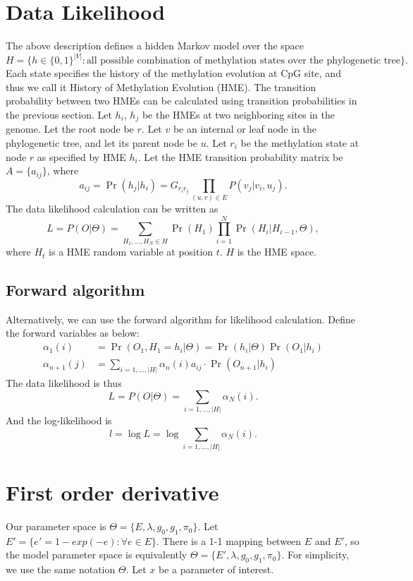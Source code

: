 \documentclass[11pt]{article}
\begin{document}
\section{Data Likelihood}
The above description defines a hidden Markov model over the
space $$H=\{h\in\{0,1\}^{|V|}: \text{all possible combination of
methylation states over the phylogenetic tree} \}.$$ Each state
specifies the history of the methylation evolution at CpG site, and
thus we call it History of Methylation Evolution (HME). The transition
probability between two HMEs can be calculated using transition
probabilities in the previous section. Let $h_i$, $h_j$ be the HMEs at
two neighboring sites in the genome. Let the root node be $r$. Let $v$
be an internal or leaf node in the phylogenetic tree, and let its
parent node be $u$. Let $r_i$ be the methylation state at node $r$ as
specified by HME $h_i$. Let the HME transition probability matrix be
$A=\{a_{ij}\}$, where
$$a_{ij}=\Pr(h_j|h_i) = G_{r_ir_j}\prod_{(u,v)\in E}P(v_j|v_i,u_j).$$
The data likelihood calculation can be written as
\begin{equation}
L = P(O|\Theta) =\sum_{H_1,\ldots, H_N\in H} \Pr(H_1)\prod_{i=1}^{N} \Pr(H_i| H_{i-1}, \Theta),
\end{equation}
where $H_t$ is a HME random variable at position $t$. $H$ is the HME
space.

\subsection*{Forward algorithm}
Alternatively, we can use the forward algorithm for likelihood
calculation. Define the forward variables as below:
\begin{equation}
\begin{aligned}
\alpha_1(i) &= \Pr(O_1, H_1=h_i|\Theta) = \Pr(h_i|\Theta)\Pr(O_1|h_i)\\
\alpha_{n+1}(j) & = \sum_{i=1,\ldots, |H|} \alpha_n(i)a_{ij} \cdot \Pr(O_{n+1}|h_i)
\end{aligned}
\end{equation}
The data likelihood is thus
$$L = P(O|\Theta) = \sum_{i=1,\ldots, |H|}\alpha_{N}(i).$$
And the log-likelihood is
$$l = \log{L} = \log\sum_{i=1,\ldots, |H|}\alpha_{N}(i).$$

\section{First order derivative}
Our parameter space is $\Theta=\{E,\lambda, g_0, g_1, \pi_0\}$.
Let $E'= \{e'= 1-exp(-e):\forall e\in E\}$. There is a 1-1 mapping
between $E$ and $E'$, so the model parameter space is equivalently
$\Theta=\{E',\lambda, g_0, g_1, \pi_0\}$. For simplicity, we use the
same notation $\Theta$. Let $x$ be a parameter of interest.
\end{document}
